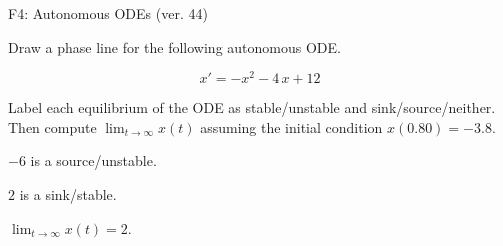 \begin{exercise}
  \begin{exerciseTitle}F4: Autonomous ODEs (ver. 44)\end{exerciseTitle}
  \begin{exerciseStatement}
    

      Draw a phase line for the following 
      autonomous ODE.
    

    
\[x'= -x^{2} - 4 \, x + 12\]

    

      Label each equilibrium of the ODE
      as stable/unstable and sink/source/neither.
      Then compute \(\lim_{t\to\infty}x(t)\)
      assuming the initial condition
      \(x( 0.80 )= -3.8\).
    

  \end{exerciseStatement}
  \begin{exerciseAnswer}
    

      \(-6\) is a source/unstable.
      
      \(2\) is a sink/stable.
    

    

      \(\lim_{t\to\infty}x(t)=2\).
    

  \end{exerciseAnswer}
\end{exercise}